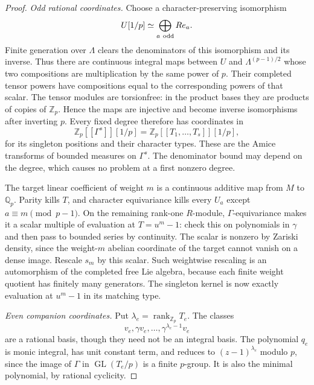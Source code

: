 \documentclass[11pt]{article}
\theoremstyle{definition}
\numberwithin{equation}{section}
\begin{document}
\begin{proof}
\emph{Odd rational coordinates.}
Choose a character-preserving isomorphism
\begin{equation}
 U[1/p]\simeq\bigoplus_{a\ {\rm odd}}Re_a.
\end{equation}
Finite generation over $\Lambda$ clears the denominators of this
isomorphism and its inverse. Thus there are continuous integral
maps between $U$ and $\Lambda^{(p-1)/2}$ whose two compositions are
multiplication by the same power of $p$. Their completed tensor
powers have compositions equal to the corresponding powers of that
scalar. The tensor modules are torsionfree: in the product bases
they are products of copies of $\mathbb Z_p$. Hence the maps are
injective and become inverse isomorphisms after inverting $p$.
Every fixed degree therefore has coordinates in
\begin{equation}
 \mathbb Z_p[[\Gamma^s]][1/p]
   =\mathbb Z_p[[T_1,\ldots,T_s]][1/p],                       \label{eq:gm2}
\end{equation}
for its singleton positions and their character types. These are
the Amice transforms of bounded measures on $\Gamma^s$.
The denominator bound may depend on the degree, which causes no
problem at a first nonzero degree.

The target linear coefficient of weight $m$ is a continuous additive
map from $M$ to $\mathbb Q_p$. Parity kills $T$, and character
equivariance kills every $U_a$ except $a\equiv m\pmod{p-1}$.
On the remaining rank-one $R$-module, $\Gamma$-equivariance makes
it a scalar multiple of evaluation at $T=u^m-1$: check this on
polynomials in $\gamma$ and then pass to bounded series by
continuity. The scalar is nonzero by Zariski density, since the
weight-$m$ abelian coordinate of the target cannot vanish on a
dense image. Rescale $s_m$ by this scalar. Such weightwise rescaling
is an automorphism of the completed free Lie algebra, because each
finite weight quotient has finitely many generators. The singleton
kernel is now exactly evaluation at $u^m-1$ in its matching type.

\emph{Even companion coordinates.}
Put $\lambda_e=\operatorname{rank}_{\mathbb Z_p}T_e$. The classes
\begin{equation}
 v_e,\gamma v_e,\ldots,\gamma^{\lambda_e-1}v_e
\end{equation}
are a rational basis, though they need not be an integral basis.
The polynomial $q_e$ is monic integral, has unit constant term,
and reduces to $(z-1)^{\lambda_e}$ modulo $p$, since the image of
$\Gamma$ in $\operatorname{GL}(T_e/p)$ is a finite $p$-group.
It is also the minimal polynomial, by rational cyclicity.


\end{proof}
\end{document}
